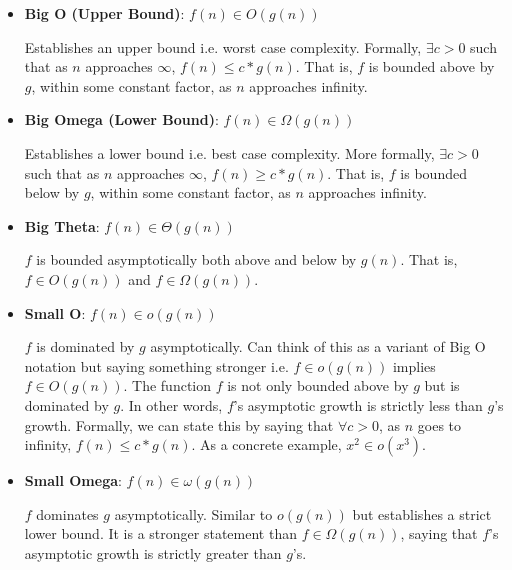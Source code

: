 \documentclass[10pt,a4paper]{article}
\begin{document}
\begin{itemize}
    \item \textbf{Big O (Upper Bound)}: $f(n) \in O(g(n))$
    
    Establishes an upper bound i.e. worst case complexity. Formally, $\exists c > 0$ such that as $n$ approaches $\infty$, $f(n) \leq c*g(n)$. That is, $f$ is bounded above by $g$, within some constant factor, as $n$ approaches infinity.

    \item \textbf{Big Omega (Lower Bound)}: $f(n) \in \Omega(g(n))$
    
    Establishes a lower bound i.e. best case complexity. More formally, $\exists c > 0$ such that as $n$ approaches $\infty$, $f(n) \geq c*g(n)$. That is, $f$ is bounded below by $g$, within some constant factor, as $n$ approaches infinity.

    \item \textbf{Big Theta}: $f(n) \in \Theta(g(n))$

    $f$ is bounded asymptotically both above and below by $g(n)$. That is, $f \in O(g(n))$ and $f \in \Omega(g(n))$.

    \item \textbf{Small O}: $f(n) \in o(g(n))$
    
    $f$ is dominated by $g$ asymptotically. Can think of this as a variant of Big O notation but saying something stronger i.e. $f \in o(g(n))$ implies $f \in O(g(n))$. The function $f$ is not only bounded above by $g$ but is dominated by $g$. In other words, $f$'s asymptotic growth is strictly less than $g$'s growth. Formally, we can state this by saying that $\forall c > 0$, as $n$ goes to infinity, $f(n) \leq c*g(n)$. As a concrete example, $x^2 \in o(x^3)$.

    \item \textbf{Small Omega}: $f(n) \in \omega(g(n))$
    
    $f$ dominates $g$ asymptotically. Similar to $o(g(n))$ but establishes a strict lower bound. It is a stronger statement than $f \in \Omega(g(n))$, saying that $f$'s asymptotic growth is strictly greater than $g$'s.
\end{itemize}
\end{document}
